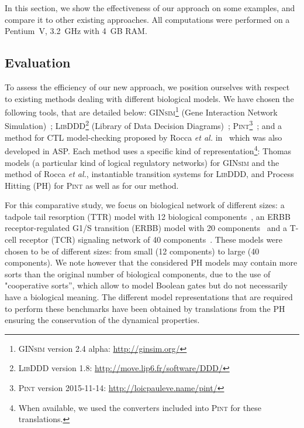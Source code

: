 In this section, we show the effectiveness of our approach on some examples,
and compare it to other existing approaches.
All computations were performed on a Pentium~V, 3.2~GHz with 4~GB RAM.

\subsection{Evaluation}
To assess the efficiency of our new approach,
we position ourselves with respect to existing methods dealing with different biological models.
We have chosen the following tools, that are detailed below: 
\textsc{GINsim}\footnote{\textsc{GINsim} version 2.4 alpha: \url{http://ginsim.org/}} (Gene Interaction Network Simulation)~\cite{gonzalez2006ginsim,naldi2009logical,naldi2007decision};
\textsc{LibDDD}\footnote{\textsc{LibDDD} version 1.8: \url{http://move.lip6.fr/software/DDD/}}
(Library of Data Decision Diagrams)~\cite{thierry2009hierarchical,colange2013towards};
\textsc{Pint}\footnote{\textsc{Pint} version 2015-11-14: \url{http://loicpauleve.name/pint/}}~\cite{PMR12-MSCS};
and a method for CTL model-checking proposed by Rocca \textit{et al.} in~\cite{roccaasp}
which was also developed in ASP.
Each method uses a specific kind of representation\footnote{When available, we used the converters included into \textsc{Pint} for these translations.}:
Thomas models (a particular kind of logical regulatory networks) for \textsc{GINsim}
and the method of Rocca \textit{et al.},
instantiable transition systems for \textsc{LibDDD},
and Process Hitting (PH) for \textsc{Pint} as well as for our method.

For this comparative study, we focus on biological network of different sizes:
a tadpole tail resorption (TTR) model with 12 biological components~\cite{khalis2009smbionet},
an ERBB receptor-regulated G1/S transition (ERBB) model with 20 components~\cite{Samaga2009}
and a T-cell receptor (TCR) signaling network of 40 components~\cite{Klamt06}.
These models were chosen to be of different sizes:
from small (12 components) to large (40 components).
We note however that the considered PH models may contain more sorts than
the original number of biological components, due to the use of
"cooperative sorts'', which allow to model Boolean gates but do not necessarily
have a biological meaning.
The different model representations that are required to perform these benchmarks have been obtained by translations
from the PH
ensuring the conservation of the dynamical properties.


